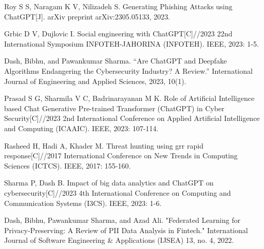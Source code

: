 \documentclass[runningheads]{llncs}
\begin{document}
\begin{thebibliography}{8}
Roy S S, Naragam K V, Nilizadeh S. Generating Phishing Attacks using ChatGPT[J]. arXiv preprint arXiv:2305.05133, 2023.

Grbic D V, Dujlovic I. Social engineering with ChatGPT[C]//2023 22nd International Symposium INFOTEH-JAHORINA (INFOTEH). IEEE, 2023: 1-5.

Dash, Bibhu, and Pawankumar Sharma. “Are ChatGPT and Deepfake Algorithms Endangering the Cybersecurity Industry? A Review.”  International Journal of Engineering and Applied Sciences, 2023, 10(1).

Prasad S G, Sharmila V C, Badrinarayanan M K. Role of Artificial Intelligence based Chat Generative Pre-trained Transformer (ChatGPT) in Cyber Security[C]//2023 2nd International Conference on Applied Artificial Intelligence and Computing (ICAAIC). IEEE, 2023: 107-114.

Rasheed H, Hadi A, Khader M. Threat hunting using grr rapid response[C]//2017 International Conference on New Trends in Computing Sciences (ICTCS). IEEE, 2017: 155-160.

Sharma P, Dash B. Impact of big data analytics and ChatGPT on cybersecurity[C]//2023 4th International Conference on Computing and Communication Systems (I3CS). IEEE, 2023: 1-6.

Dash, Bibhu, Pawankumar Sharma, and Azad Ali. "Federated Learning for Privacy-Preserving: A Review of PII Data Analysis in Fintech." International Journal of Software Engineering \& Applications (IJSEA) 13, no. 4, 2022.






\end{thebibliography}
\end{document}
